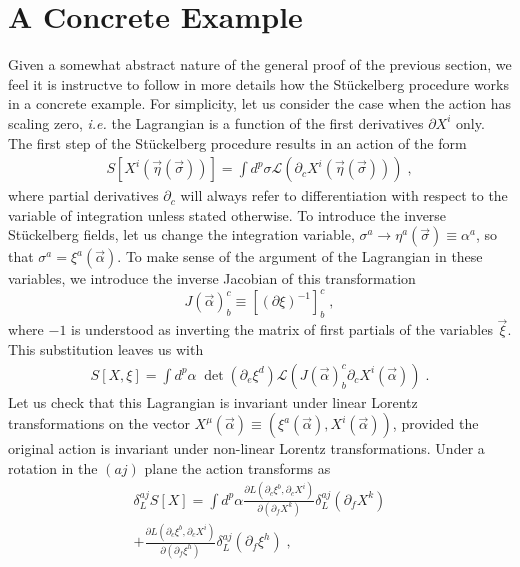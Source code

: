 \documentclass[%
 reprint,
 amsmath,amssymb,
 aps,
]{revtex4-1}
\begin{document}
\section{A Concrete Example}
Given a somewhat abstract nature of the general proof of the previous section, we feel it is instructve to follow in more details
 how the St\"uckelberg procedure works in a concrete example. For simplicity, let us consider the case when the action has scaling zero,
 {\it i.e.} the Lagrangian is a function of the first derivatives $\partial X^i$ only. The first step of the St\"uckelberg procedure results in an action of the form
\begin{eqnarray}
     S[X^i(\vec{\eta}(\vec{\sigma}))] = \int d^p \sigma \mathcal{L}
     (\partial_c X^i (\vec{\eta}(\vec{\sigma}))) \; , \nonumber
\end{eqnarray}
where partial derivatives $\partial_c$ will always refer to differentiation with respect to the variable of integration
unless stated otherwise.  To introduce the inverse St\"uckelberg fields, let us change the integration variable,
 $\sigma^a \rightarrow \eta^a(\vec{\sigma}) \equiv \alpha^a$, so that
$\sigma^a = \xi^a(\vec{\alpha})$. To make sense of the argument of the Lagrangian in these variables, we introduce the inverse
Jacobian of this transformation
\begin{equation}
    J(\vec{\alpha})^c_b \equiv [(\partial \xi)^{-1}]^c_b \; ,
\end{equation}
where $-1$ is understood as inverting the matrix of first partials of the variables $\vec{\xi}$.
This substitution leaves us with
\begin{eqnarray}
  S[X,\xi]  = \int d^p \alpha\;
   \mathrm{\det}\left({\partial_e \xi^d} \right)
   \mathcal{L}( J(\vec{\alpha})^c_b \partial_c X^i(\vec{\alpha}) )
     \; . \nonumber
\end{eqnarray}
Let us check that this Lagrangian is invariant under linear Lorentz
transformations on the vector $X^{\mu}(\vec{\alpha}) \equiv (\xi^a(\vec{\alpha}), X^i(\vec{\alpha}))$, provided the original  action is invariant
under non-linear Lorentz transformations.
 Under  a rotation
in the $(aj)$ plane the action transforms as
\begin{gather}
\label{Lvariation}
    \delta^{a j}_{L}S[X] =
    \int d^p \alpha \frac{\partial L(\partial_c \xi^b, \partial_c X^i)}{\partial(\partial_f X^k)}
    \delta^{a j}_{L} (\partial_f X^k)  \\
    + \frac{\partial L(\partial_c \xi^b, \partial_c X^i)}{\partial(\partial_f \xi^h)}
    \delta^{a j}_{L} (\partial_f \xi^h) \nonumber\;,
\end{gather}
\end{document}
